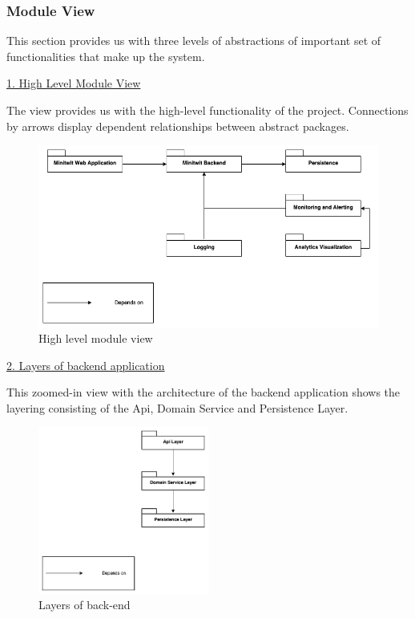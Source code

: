\subsubsection*{Module View}

This section provides us with three levels of abstractions of important set of functionalities that make up the system.
\vspace{3mm}

\underline{1. High Level Module View}
\vspace{3mm}

The view provides us with the high-level functionality of the project. Connections by arrows display dependent relationships between abstract packages.

\begin{figure}[h!]
    \centering
    \includegraphics[width=\linewidth,height=\textheight,keepaspectratio]{images/architectural_views/minitwit_module_view_high_level.png}
    \caption{High level module view ~\cite{moduleViewHighLevel}}
    \label{fig:moduleview}
\end{figure}

\newpage

\underline{2. Layers of backend application}
\vspace{3mm}

This zoomed-in view with the architecture of the backend application shows the layering consisting of the Api, Domain Service and Persistence Layer.

\begin{figure}[h!]
    \centering
    \includegraphics[width=0.5\textwidth]{images/architectural_views/minitwit_module_view_backend_layers.png}
    \caption{Layers of back-end ~\cite{moduleViewLayers}}
    \label{fig:modulebackend}
\end{figure}

